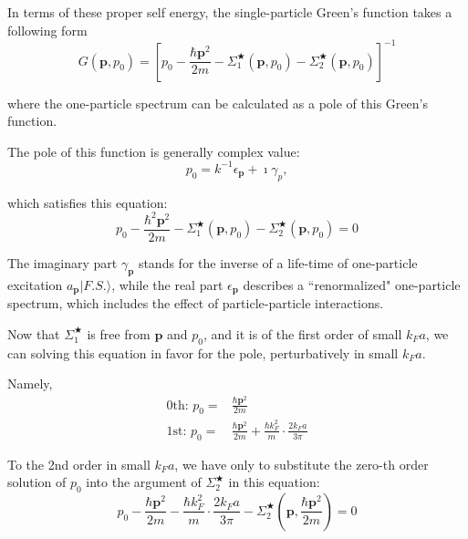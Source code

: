 In terms of these proper self energy, the single-particle Green's function takes a following form
\[ G(\mathbf{p},p_0) = \left[p_0-\frac{\hbar \mathbf{p}^2}{2m} - \Sigma_1^{\bigstar}(\mathbf{p},p_0)-\Sigma_2^{\bigstar}(\mathbf{p},p_0)\right]^{-1} \]

where the one-particle spectrum can be calculated as a pole of this Green's function.

The pole of this function is generally complex value:
\begin{equation} \label{Eqs2.7.30}
p_0 = k^{-1}\epsilon_{\mathbf{p}} +\imath \gamma_p,
\end{equation}

which satisfies this equation:
\begin{equation} \label{Eqs2.7.31}
p_0 - \frac{\hbar^2\mathbf{p}^2}{2m}-\Sigma_1^{\bigstar}(\mathbf{p},p_0)-\Sigma_2^{\bigstar}(\mathbf{p},p_0) = 0
\end{equation}

The imaginary part $\gamma_{\mathbf{p}}$ stands for the inverse of a life-time of one-particle excitation $a_{\mathbf{p}} |F.S.\rangle$, while the real part $\epsilon_{\mathbf{p}}$ describes a ``renormalized" one-particle spectrum, which includes the effect of particle-particle interactions.

Now that $\Sigma_1^{\bigstar}$ is free from $\mathbf{p}$ and $p_0$, and it is of the first order of small $k_F a$, we can solving this equation in favor for the pole, perturbatively in small $k_F a$.

Namely,
\[ \begin{split}
\text{0th: } p_0=&\frac{\hbar\mathbf{p}^2}{2m}\\
\text{1st: } p_0=&\frac{\hbar\mathbf{p}^2}{2m} + \frac{\hbar k_F^2}{m}\cdot\frac{2 k_F a}{3\pi}
\end{split} \]

To the 2nd order in small $k_F a$, we have only to substitute the zero-th order solution of $p_0$ into the argument of $\Sigma_2^{\bigstar}$ in this equation:
\[ p_0 - \frac{\hbar \mathbf{p}^2}{2m}-\frac{\hbar k_F^2}{m}\cdot\frac{2 k_F a}{3\pi} - \Sigma_2^{\bigstar}(\mathbf{p},\frac{\hbar \mathbf{p}^2}{2m}) = 0\]

